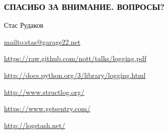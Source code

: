 \documentclass[aspectratio=169]{beamer}
\begin{document}
\begin{finalframe}
  \frametitle{СПАСИБО ЗА ВНИМАНИЕ. ВОПРОСЫ?}
    \begin{block}{Стас Рудаков}
    \par \url{mailto:stas@garage22.net}
    \par \url{https://raw.github.com/nott/talks/logging.pdf}
    \end{block}

    \begin{block}
      \par \url{http://docs.python.org/3/library/logging.html}
      \par \url{http://www.structlog.org/}
      \par \url{https://www.getsentry.com/}
      \par \url{http://logstash.net/}
    \end{block}
\end{finalframe}
\end{document}
